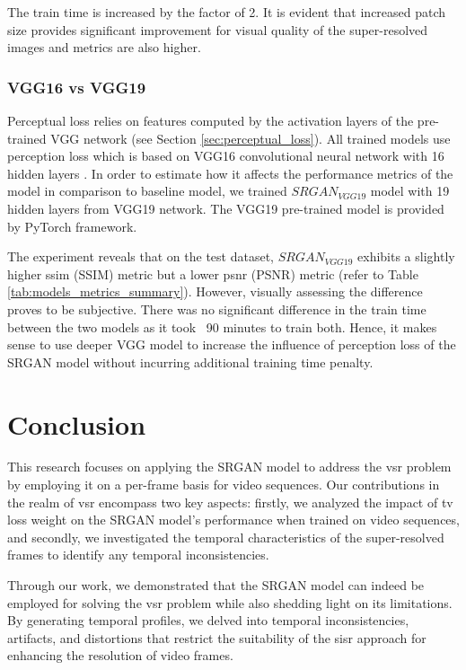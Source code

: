 \documentclass[conference]{IEEEtran}
\begin{document}
The train time is increased by the factor of 2. It is evident that increased patch size provides significant improvement for visual quality of the super-resolved images and metrics are also higher.

\subsubsection{VGG16 vs VGG19}

Perceptual loss relies on features computed by the activation layers of the pre-trained VGG network (see Section \ref{sec:perceptual_loss}). All trained models use perception loss which is based on VGG16 convolutional neural network with 16 hidden layers \cite{vgg_very_deep_cnn_2014}. In order to estimate how it affects the performance metrics of the model in comparison to baseline model, we trained $SRGAN_{VGG19}$ model with 19 hidden layers from VGG19 network. The VGG19 pre-trained model is provided by PyTorch framework.

The experiment reveals that on the test dataset, $SRGAN_{VGG19}$ exhibits a slightly higher \acrlong{ssim} (SSIM) metric but a lower \acrlong{psnr} (PSNR) metric (refer to Table \ref{tab:models_metrics_summary}). However, visually assessing the difference proves to be subjective. There was no significant difference in the train time between the two models as it took ~90 minutes to train both. Hence, it makes sense to use deeper VGG model to increase the influence of perception loss of the SRGAN model without incurring additional training time penalty.

\section{Conclusion}

This research focuses on applying the SRGAN model to address the \acrlong{vsr} problem by employing it on a per-frame basis for video sequences. Our contributions in the realm of \acrlong{vsr} encompass two key aspects: firstly, we analyzed the impact of \acrlong{tv} loss weight on the SRGAN model's performance when trained on video sequences, and secondly, we investigated the temporal characteristics of the super-resolved frames to identify any temporal inconsistencies.

Through our work, we demonstrated that the SRGAN model can indeed be employed for solving the \acrlong{vsr} problem while also shedding light on its limitations. By generating temporal profiles, we delved into temporal inconsistencies, artifacts, and distortions that restrict the suitability of the \acrlong{sisr} approach for enhancing the resolution of video frames.
\end{document}
